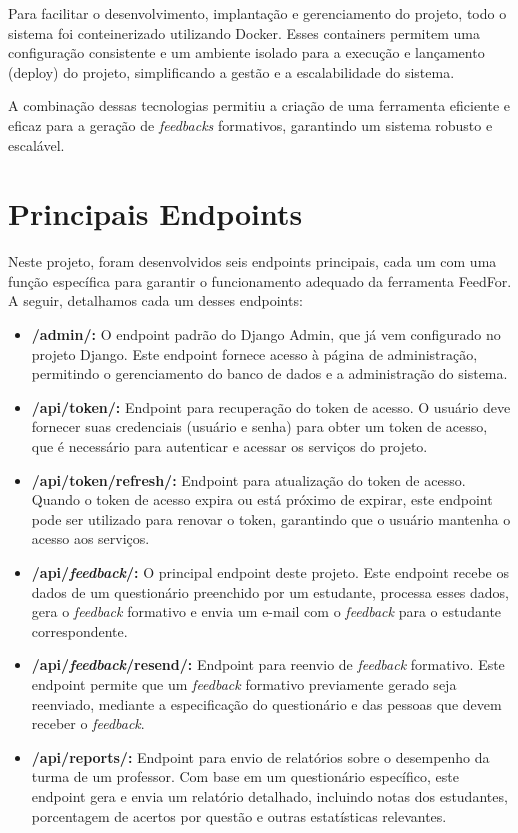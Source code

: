 Para facilitar o desenvolvimento, implantação e gerenciamento do projeto, todo o sistema foi conteinerizado utilizando Docker. Esses containers permitem uma configuração consistente e um ambiente isolado para a execução e lançamento (deploy) do projeto, simplificando a gestão e a escalabilidade do sistema. 

A combinação dessas tecnologias permitiu a criação de uma ferramenta eficiente e eficaz para a geração de \textit{feedbacks} formativos, garantindo um sistema robusto e escalável.


\section{Principais Endpoints}

Neste projeto, foram desenvolvidos seis endpoints principais, cada um com uma função específica para garantir o funcionamento adequado da ferramenta FeedFor. A seguir, detalhamos cada um desses endpoints:

\begin{itemize}
    \item \textbf{/admin/:} O endpoint padrão do Django Admin, que já vem configurado no projeto Django. Este endpoint fornece acesso à página de administração, permitindo o gerenciamento do banco de dados e a administração do sistema.
    
    \item \textbf{/api/token/:} Endpoint para recuperação do token de acesso. O usuário deve fornecer suas credenciais (usuário e senha) para obter um token de acesso, que é necessário para autenticar e acessar os serviços do projeto.
    
    \item \textbf{/api/token/refresh/:} Endpoint para atualização do token de acesso. Quando o token de acesso expira ou está próximo de expirar, este endpoint pode ser utilizado para renovar o token, garantindo que o usuário mantenha o acesso aos serviços.
    
    \item \textbf{/api/\textit{feedback}/:} O principal endpoint deste projeto. Este endpoint recebe os dados de um questionário preenchido por um estudante, processa esses dados, gera o \textit{feedback} formativo e envia um e-mail com o \textit{feedback} para o estudante correspondente.
    
    \item \textbf{/api/\textit{feedback}/resend/:} Endpoint para reenvio de \textit{feedback} formativo. Este endpoint permite que um \textit{feedback} formativo previamente gerado seja reenviado, mediante a especificação do questionário e das pessoas que devem receber o \textit{feedback}.
    
    \item \textbf{/api/reports/:} Endpoint para envio de relatórios sobre o desempenho da turma de um professor. Com base em um questionário específico, este endpoint gera e envia um relatório detalhado, incluindo notas dos estudantes, porcentagem de acertos por questão e outras estatísticas relevantes.
\end{itemize}

